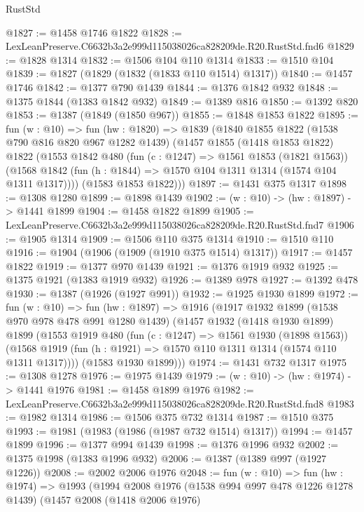 \begin{lexlean}{RustStd}
\begin{coremodule}
@1827 := @1458 @1746 @1822
@1828 := LexLeanPreserve.C6632b3a2e999d115038026ca828209de.R20.RustStd.fnd6
@1829 := @1828 @1314
@1832 := @1506 @104 @110 @1314
@1833 := @1510 @104
@1839 := @1827 (@1829 (@1832 (@1833 @110 @1514) @1317))
@1840 := @1457 @1746
@1842 := @1377 @790 @1439
@1844 := @1376 @1842 @932
@1848 := @1375 @1844 (@1383 @1842 @932)
@1849 := @1389 @816
@1850 := @1392 @820
@1853 := @1387 (@1849 (@1850 @967))
@1855 := @1848 @1853 @1822
@1895 := fun (w : @10) =>
  fun (hw : @1820) =>
  @1839
    (@1840
      @1855
      @1822
      (@1538 @790 @816 @820 @967 @1282 @1439)
      (@1457
        @1855
        (@1418 @1853 @1822)
        @1822
        (@1553
          @1842
          @480
          (fun (c : @1247) => @1561 @1853 (@1821 @1563))
          (@1568 @1842 (fun (h : @1844) => @1570 @104 @1311 @1314 (@1574 @104 @1311 @1317))))
        (@1583 @1853 @1822)))
@1897 := @1431 @375 @1317
@1898 := @1308 @1280
@1899 := @1898 @1439
@1902 := (w : @10) -> (hw : @1897) -> @1441 @1899
@1904 := @1458 @1822 @1899
@1905 := LexLeanPreserve.C6632b3a2e999d115038026ca828209de.R20.RustStd.fnd7
@1906 := @1905 @1314
@1909 := @1506 @110 @375 @1314
@1910 := @1510 @110
@1916 := @1904 (@1906 (@1909 (@1910 @375 @1514) @1317))
@1917 := @1457 @1822
@1919 := @1377 @970 @1439
@1921 := @1376 @1919 @932
@1925 := @1375 @1921 (@1383 @1919 @932)
@1926 := @1389 @978
@1927 := @1392 @478
@1930 := @1387 (@1926 (@1927 @991))
@1932 := @1925 @1930 @1899
@1972 := fun (w : @10) =>
  fun (hw : @1897) =>
  @1916
    (@1917
      @1932
      @1899
      (@1538 @970 @978 @478 @991 @1280 @1439)
      (@1457
        @1932
        (@1418 @1930 @1899)
        @1899
        (@1553
          @1919
          @480
          (fun (c : @1247) => @1561 @1930 (@1898 @1563))
          (@1568 @1919 (fun (h : @1921) => @1570 @110 @1311 @1314 (@1574 @110 @1311 @1317))))
        (@1583 @1930 @1899)))
@1974 := @1431 @732 @1317
@1975 := @1308 @1278
@1976 := @1975 @1439
@1979 := (w : @10) -> (hw : @1974) -> @1441 @1976
@1981 := @1458 @1899 @1976
@1982 := LexLeanPreserve.C6632b3a2e999d115038026ca828209de.R20.RustStd.fnd8
@1983 := @1982 @1314
@1986 := @1506 @375 @732 @1314
@1987 := @1510 @375
@1993 := @1981 (@1983 (@1986 (@1987 @732 @1514) @1317))
@1994 := @1457 @1899
@1996 := @1377 @994 @1439
@1998 := @1376 @1996 @932
@2002 := @1375 @1998 (@1383 @1996 @932)
@2006 := @1387 (@1389 @997 (@1927 @1226))
@2008 := @2002 @2006 @1976
@2048 := fun (w : @10) =>
  fun (hw : @1974) =>
  @1993
    (@1994
      @2008
      @1976
      (@1538 @994 @997 @478 @1226 @1278 @1439)
      (@1457
        @2008
        (@1418 @2006 @1976)

\end{coremodule}
\end{lexlean}
